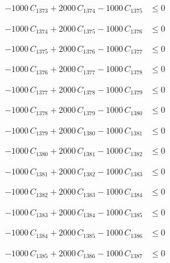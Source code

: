 \documentclass[a4paper,11pt]{article}
\begin{document}
\begin{align}
-1000\,C_{1373} + 2000\,C_{1374} - 1000\,C_{1375} &\leq 0 \nonumber
\end{align}

\begin{align}
-1000\,C_{1374} + 2000\,C_{1375} - 1000\,C_{1376} &\leq 0 \nonumber
\end{align}

\begin{align}
-1000\,C_{1375} + 2000\,C_{1376} - 1000\,C_{1377} &\leq 0 \nonumber
\end{align}

\begin{align}
-1000\,C_{1376} + 2000\,C_{1377} - 1000\,C_{1378} &\leq 0 \nonumber
\end{align}

\begin{align}
-1000\,C_{1377} + 2000\,C_{1378} - 1000\,C_{1379} &\leq 0 \nonumber
\end{align}

\begin{align}
-1000\,C_{1378} + 2000\,C_{1379} - 1000\,C_{1380} &\leq 0 \nonumber
\end{align}

\begin{align}
-1000\,C_{1379} + 2000\,C_{1380} - 1000\,C_{1381} &\leq 0 \nonumber
\end{align}

\begin{align}
-1000\,C_{1380} + 2000\,C_{1381} - 1000\,C_{1382} &\leq 0 \nonumber
\end{align}

\begin{align}
-1000\,C_{1381} + 2000\,C_{1382} - 1000\,C_{1383} &\leq 0 \nonumber
\end{align}

\begin{align}
-1000\,C_{1382} + 2000\,C_{1383} - 1000\,C_{1384} &\leq 0 \nonumber
\end{align}

\begin{align}
-1000\,C_{1383} + 2000\,C_{1384} - 1000\,C_{1385} &\leq 0 \nonumber
\end{align}

\begin{align}
-1000\,C_{1384} + 2000\,C_{1385} - 1000\,C_{1386} &\leq 0 \nonumber
\end{align}

\begin{align}
-1000\,C_{1385} + 2000\,C_{1386} - 1000\,C_{1387} &\leq 0 \nonumber
\end{align}
\end{document}
